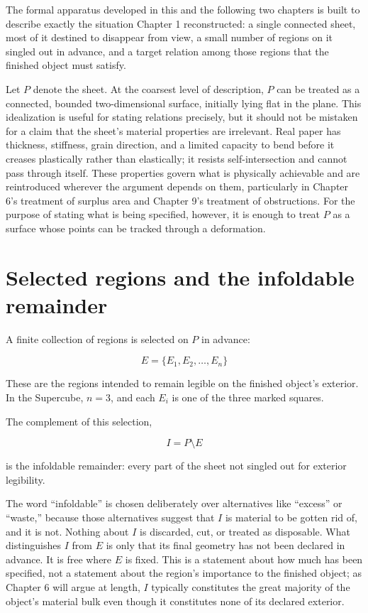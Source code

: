 \documentclass[11pt,oneside]{book}
\begin{document}
The formal apparatus developed in this and the following two chapters is
built to describe exactly the situation Chapter 1 reconstructed: a
single connected sheet, most of it destined to disappear from view, a
small number of regions on it singled out in advance, and a target
relation among those regions that the finished object must satisfy.

Let \(P\) denote the sheet. At the coarsest level of description, \(P\)
can be treated as a connected, bounded two-dimensional surface,
initially lying flat in the plane. This idealization is useful for
stating relations precisely, but it should not be mistaken for a claim
that the sheet's material properties are irrelevant. Real paper has
thickness, stiffness, grain direction, and a limited capacity to bend
before it creases plastically rather than elastically; it resists
self-intersection and cannot pass through itself. These properties
govern what is physically achievable and are reintroduced wherever the
argument depends on them, particularly in Chapter 6's treatment of
surplus area and Chapter 9's treatment of obstructions. For the purpose
of stating what is being specified, however, it is enough to treat \(P\)
as a surface whose points can be tracked through a deformation.

\hypertarget{selected-regions-and-the-infoldable-remainder}{%
\section{Selected regions and the infoldable
remainder}\label{selected-regions-and-the-infoldable-remainder}}

A finite collection of regions is selected on \(P\) in advance:

\[E = \{E_1, E_2, \ldots, E_n\}\]

These are the regions intended to remain legible on the finished
object's exterior. In the Supercube, \(n = 3\), and each \(E_i\) is one
of the three marked squares.

The complement of this selection,

\[I = P \setminus E\]

is the infoldable remainder: every part of the sheet not singled out for
exterior legibility.

The word ``infoldable'' is chosen deliberately over alternatives like
``excess'' or ``waste,'' because those alternatives suggest that \(I\)
is material to be gotten rid of, and it is not. Nothing about \(I\) is
discarded, cut, or treated as disposable. What distinguishes \(I\) from
\(E\) is only that its final geometry has not been declared in advance.
It is free where \(E\) is fixed. This is a statement about how much has
been specified, not a statement about the region's importance to the
finished object; as Chapter 6 will argue at length, \(I\) typically
constitutes the great majority of the object's material bulk even though
it constitutes none of its declared exterior.
\end{document}
